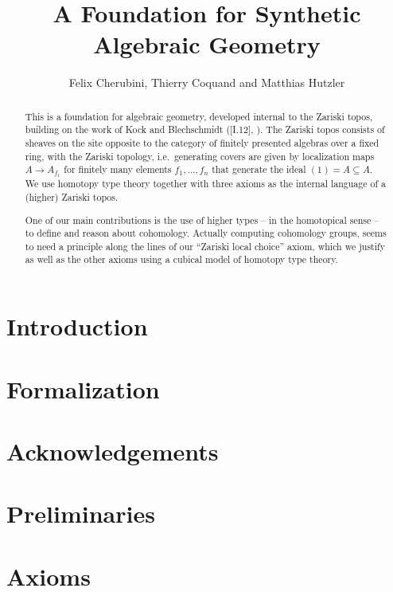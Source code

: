 \documentclass{../util/zariski}
\title{A Foundation for Synthetic Algebraic Geometry}
\author{Felix Cherubini, Thierry Coquand and Matthias Hutzler}
\begin{document}
\maketitle

\begin{abstract}
  This is a foundation for algebraic geometry, developed internal to the Zariski topos, building on the work of Kock and Blechschmidt (\cite{kock-sdg}[I.12], \cite{ingo-thesis}).
  The Zariski topos consists of sheaves on the site opposite to the category of finitely presented algebras over a fixed ring, with the Zariski topology, i.e.\ generating covers are given by localization maps $A\to A_{f_1}$ for finitely many elements $f_1,\dots,f_n$ that generate the ideal $(1)=A\subseteq A$.
  We use homotopy type theory together with three axioms as the internal language of a (higher) Zariski topos.

  One of our main contributions is the use of higher types -- in the homotopical sense -- to define and reason about cohomology.
  Actually computing cohomology groups, seems to need a principle along the lines of our ``Zariski local choice'' axiom,
  which we justify as well as the other axioms using a cubical model of homotopy type theory.
\end{abstract}

\tableofcontents

\section*{Introduction}


\section*{Formalization}


\section*{Acknowledgements}


\section{Preliminaries}


\section{Axioms}

\end{document}
